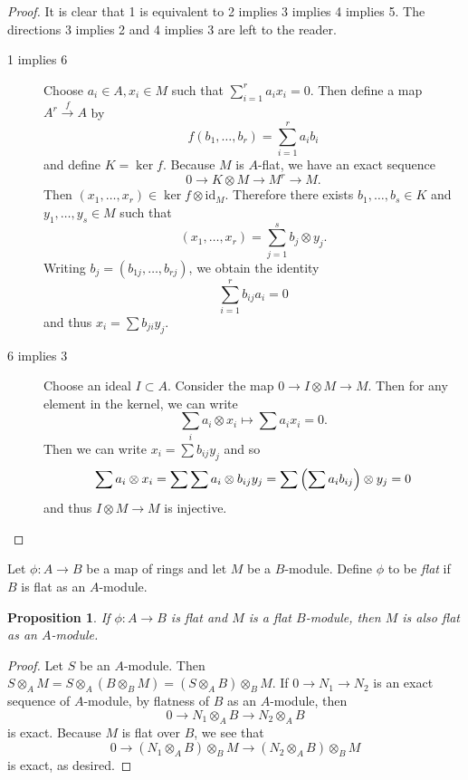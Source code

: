 \documentclass[leqno, openany]{memoir}
\newtheorem{prop}[thm]{Proposition}
\theoremstyle{definition}
\theoremstyle{remark}
\theoremstyle{plain}
\theoremstyle{definition}
\theoremstyle{remark}
\newcommand{\mr}[1]{\mathrm{#1}}
\begin{document}
\begin{proof}
    It is clear that 1 is equivalent to 2 implies 3 implies 4 implies 5. The directions 3 implies 2 and 4 implies 3 are left to the reader. 
    \begin{description}
        \item[1 implies 6] Choose $a_i \in A, x_i \in M$ such that $\sum_{i=1}^r a_i x_i = 0$. Then define a map $A^r \xrightarrow{f} A$ by
            \[ f(b_1, \ldots, b_r) = \sum_{i=1}^r a_i b_i \]
            and define $K = \ker f$. 
            Because $M$ is $A$-flat, we have an exact sequence
            \[ 0 \to K \otimes M \to M^r \to M. \]
            Then $(x_1, \ldots, x_r) \in \ker f \otimes \mr{id}_M$. Therefore there exists $b_1, \ldots, b_s \in K$ and $y_1, \ldots, y_s \in M$ such that 
            \[ (x_1, \ldots, x_r) = \sum_{j=1}^s b_j \otimes y_j. \]
            Writing $b_j = (b_{1j}, \ldots, b_{rj})$, we obtain the identity
            \[ \sum_{i=1}^r b_{ij} a_i = 0 \]
            and thus $x_i = \sum b_{ji} y_j$.
        \item[6 implies 3] Choose an ideal $I \subset A$. Consider the map $0 \to I \otimes M \to M$. Then for any element in the kernel, we can write 
            \[ \sum_i a_i \otimes x_i \mapsto \sum a_i x_i = 0. \]
            Then we can write $x_i = \sum b_{ij} y_j$ and so
            \[ \sum a_i \otimes x_i = \sum \sum a_i \otimes b_{ij}y_j = \sum \qty(\sum a_i b_{ij}) \otimes y_j = 0 \]
            and thus $I \otimes M \to M$ is injective. \qedhere
    \end{description}
\end{proof}

Let $\phi: A \to B$ be a map of rings and let $M$ be a $B$-module. Define $\phi$ to be \textit{flat} if $B$ is flat as an $A$-module.

\begin{prop}
    If $\phi: A \to B$ is flat and $M$ is a flat $B$-module, then $M$ is also flat as an $A$-module.
\end{prop}

\begin{proof}
    Let $S$ be an $A$-module. Then $S \otimes_A M = S \otimes_A (B \otimes_B M) = (S \otimes_A B) \otimes_B M$. If $0 \to N_1 \to N_2$ is an exact sequence of $A$-module, by flatness of $B$ as an $A$-module, then
    \[ 0 \to N_1 \otimes_A B \to N_2 \otimes_A B\]
    is exact. Because $M$ is flat over $B$, we see that
    \[ 0 \to (N_1 \otimes_A B) \otimes_B M \to (N_2 \otimes_A B) \otimes_B M \]
    is exact, as desired.
\end{proof}
\end{document}
